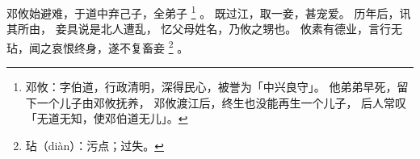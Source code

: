 
\switchcolumn*[\section{}]

邓攸始避难，于道中弃己子，全弟子%
\footnote{%
    邓攸：字伯道，行政清明，深得民心，被誉为「中兴良守」。
          他弟弟早死，留下一个儿子由邓攸抚养，
          邓攸渡江后，终生也没能再生一个儿子，
          后人常叹「无道无知，使邓伯道无儿」。
}%
。
既过江，取一妾，甚宠爱。
历年后，讯其所由，
妾具说是北人遭乱，
忆父母姓名，乃攸之甥也。
攸素有德业，言行无玷，闻之哀恨终身，遂不复畜妾%
\footnote{%
    玷（diàn）：污点；过失。
}%
。

\switchcolumn



